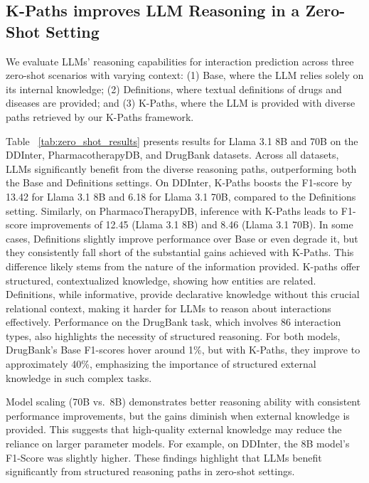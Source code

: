 \subsection{K-Paths improves LLM Reasoning in a Zero-Shot Setting} \label{result-zero-shot}
We evaluate LLMs' reasoning capabilities for interaction prediction across three zero-shot scenarios with varying context: (1) Base, where the LLM relies solely on its internal knowledge; (2) Definitions, where textual definitions of drugs and diseases are provided; and (3) K-Paths, where the LLM is provided with diverse paths retrieved by our K-Paths framework.

Table ~\ref{tab:zero_shot_results} presents results for Llama 3.1 8B and 70B on the DDInter, PharmacotherapyDB, and DrugBank datasets.
Across all datasets, LLMs significantly benefit from the diverse reasoning paths, outperforming both the Base and Definitions settings. 
On DDInter, K-Paths boosts the F1-score by 13.42 for Llama 3.1 8B and 6.18 for Llama 3.1 70B, compared to the Definitions setting.
Similarly, on PharmacoTherapyDB, inference with K-Paths leads to F1-score improvements of 12.45 (Llama 3.1 8B) and 8.46 (Llama 3.1 70B).
In some cases, Definitions slightly improve performance over Base or even degrade it, but they consistently fall short of the substantial gains achieved with K-Paths.
This difference likely stems from the nature of the information provided.
K-paths offer structured, contextualized knowledge, showing how entities are related.
Definitions, while informative, provide declarative knowledge without this crucial relational context, making it harder for LLMs to reason about interactions effectively.
Performance on the DrugBank task, which involves 86 interaction types, also highlights the necessity of structured reasoning. 
For both models, DrugBank's Base F1-scores hover around 1\%, but with K-Paths, they improve to approximately 40\%, emphasizing the importance of structured external knowledge in such complex tasks.

Model scaling (70B vs.\ 8B) demonstrates better reasoning ability with consistent performance improvements, but the gains diminish when external knowledge is provided. 
This suggests that high-quality external knowledge may reduce the reliance on larger parameter models. 
For example, on DDInter, the 8B model's F1-Score was slightly higher.
These findings highlight that LLMs benefit significantly from structured reasoning paths in zero-shot settings.


